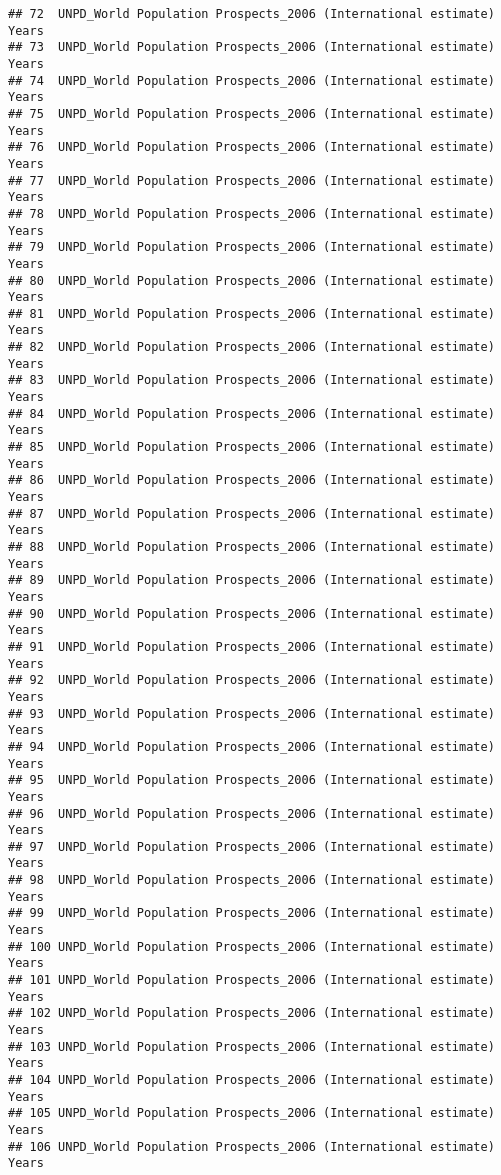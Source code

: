 \documentclass[]{article}
\begin{document}
\begin{verbatim}
## 72  UNPD_World Population Prospects_2006 (International estimate) Years
## 73  UNPD_World Population Prospects_2006 (International estimate) Years
## 74  UNPD_World Population Prospects_2006 (International estimate) Years
## 75  UNPD_World Population Prospects_2006 (International estimate) Years
## 76  UNPD_World Population Prospects_2006 (International estimate) Years
## 77  UNPD_World Population Prospects_2006 (International estimate) Years
## 78  UNPD_World Population Prospects_2006 (International estimate) Years
## 79  UNPD_World Population Prospects_2006 (International estimate) Years
## 80  UNPD_World Population Prospects_2006 (International estimate) Years
## 81  UNPD_World Population Prospects_2006 (International estimate) Years
## 82  UNPD_World Population Prospects_2006 (International estimate) Years
## 83  UNPD_World Population Prospects_2006 (International estimate) Years
## 84  UNPD_World Population Prospects_2006 (International estimate) Years
## 85  UNPD_World Population Prospects_2006 (International estimate) Years
## 86  UNPD_World Population Prospects_2006 (International estimate) Years
## 87  UNPD_World Population Prospects_2006 (International estimate) Years
## 88  UNPD_World Population Prospects_2006 (International estimate) Years
## 89  UNPD_World Population Prospects_2006 (International estimate) Years
## 90  UNPD_World Population Prospects_2006 (International estimate) Years
## 91  UNPD_World Population Prospects_2006 (International estimate) Years
## 92  UNPD_World Population Prospects_2006 (International estimate) Years
## 93  UNPD_World Population Prospects_2006 (International estimate) Years
## 94  UNPD_World Population Prospects_2006 (International estimate) Years
## 95  UNPD_World Population Prospects_2006 (International estimate) Years
## 96  UNPD_World Population Prospects_2006 (International estimate) Years
## 97  UNPD_World Population Prospects_2006 (International estimate) Years
## 98  UNPD_World Population Prospects_2006 (International estimate) Years
## 99  UNPD_World Population Prospects_2006 (International estimate) Years
## 100 UNPD_World Population Prospects_2006 (International estimate) Years
## 101 UNPD_World Population Prospects_2006 (International estimate) Years
## 102 UNPD_World Population Prospects_2006 (International estimate) Years
## 103 UNPD_World Population Prospects_2006 (International estimate) Years
## 104 UNPD_World Population Prospects_2006 (International estimate) Years
## 105 UNPD_World Population Prospects_2006 (International estimate) Years
## 106 UNPD_World Population Prospects_2006 (International estimate) Years

\end{verbatim}
\end{document}
